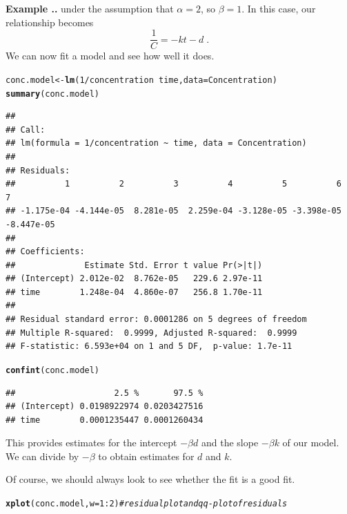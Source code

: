 \documentclass[twoside]{book}\usepackage[]{graphicx}\usepackage[]{xcolor}
\makeatletter
\newcommand{\hlnum}[1]{\textcolor[rgb]{0.686,0.059,0.569}{#1}}%
\newcommand{\hlcom}[1]{\textcolor[rgb]{0.678,0.584,0.686}{\textit{#1}}}%
\newcommand{\hlopt}[1]{\textcolor[rgb]{0,0,0}{#1}}%
\newcommand{\hlstd}[1]{\textcolor[rgb]{0.345,0.345,0.345}{#1}}%
\newcommand{\hlkwb}[1]{\textcolor[rgb]{0.69,0.353,0.396}{#1}}%
\newcommand{\hlkwc}[1]{\textcolor[rgb]{0.333,0.667,0.333}{#1}}%
\newcommand{\hlkwd}[1]{\textcolor[rgb]{0.737,0.353,0.396}{\textbf{#1}}}%
\newenvironment{kframe}{%
 \def\at@end@of@kframe{}%
 \ifinner\ifhmode%
  \def\at@end@of@kframe{\end{minipage}}%
  \begin{minipage}{\columnwidth}%
 \fi\fi%
 \def\FrameCommand##1{\hskip\@totalleftmargin \hskip-\fboxsep
 \colorbox{shadecolor}{##1}\hskip-\fboxsep
     \hskip-\linewidth \hskip-\@totalleftmargin \hskip\columnwidth}%
 \MakeFramed {\advance\hsize-\width
   \@totalleftmargin\z@ \linewidth\hsize
   \@setminipage}}%
 {\par\unskip\endMakeFramed%
 \at@end@of@kframe}
\newenvironment{knitrout}{}{} %
\newcounter{example}[section]
\newenvironment{example}%
{\refstepcounter{example}%
\textbf{Example \thesection.\arabic{example}. }}%
{}
\makeatother
\begin{document}
\begin{example}
\begin{knitrout}
\end{knitrout}
under the assumption that 
$\alpha=2$, so $\beta = 1$.  In this case, our relationship becomes
\[
\frac{1}{C}  = - k t - d \;.
 \]
We can now fit a model and see how well it does.
\begin{knitrout}
\color{fgcolor}\begin{kframe}
\begin{alltt}
\hlstd{conc.model} \hlkwb{<-} \hlkwd{lm}\hlstd{(}\hlnum{1}\hlopt{/}\hlstd{concentration} \hlopt{~} \hlstd{time,} \hlkwc{data} \hlstd{= Concentration)}
\hlkwd{summary}\hlstd{(conc.model)}
\end{alltt}
\begin{verbatim}
## 
## Call:
## lm(formula = 1/concentration ~ time, data = Concentration)
## 
## Residuals:
##          1          2          3          4          5          6          7 
## -1.175e-04 -4.144e-05  8.281e-05  2.259e-04 -3.128e-05 -3.398e-05 -8.447e-05 
## 
## Coefficients:
##              Estimate Std. Error t value Pr(>|t|)
## (Intercept) 2.012e-02  8.762e-05   229.6 2.97e-11
## time        1.248e-04  4.860e-07   256.8 1.70e-11
## 
## Residual standard error: 0.0001286 on 5 degrees of freedom
## Multiple R-squared:  0.9999,	Adjusted R-squared:  0.9999 
## F-statistic: 6.593e+04 on 1 and 5 DF,  p-value: 1.7e-11
\end{verbatim}
\begin{alltt}
\hlkwd{confint}\hlstd{(conc.model)}
\end{alltt}
\begin{verbatim}
##                    2.5 %       97.5 %
## (Intercept) 0.0198922974 0.0203427516
## time        0.0001235447 0.0001260434
\end{verbatim}
\end{kframe}
\end{knitrout}
This provides estimates for 
the intercept $- \beta d$ 
and the slope $- \beta k$ 
of our model.
We can divide by $-\beta$ to obtain estimates for $d$ and $k$.

Of course, we should always look to see whether the fit is a good fit.
\begin{knitrout}
\color{fgcolor}\begin{kframe}
\begin{alltt}
\hlkwd{xplot}\hlstd{(conc.model,} \hlkwc{w} \hlstd{=} \hlnum{1}\hlopt{:}\hlnum{2}\hlstd{)}  \hlcom{# residual plot and qq-plot of residuals}
\end{alltt}
\end{kframe}


\end{knitrout}
\end{example}
\end{document}
